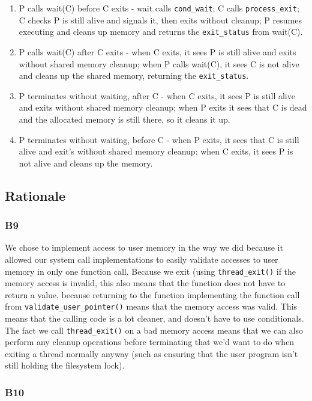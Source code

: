 \documentclass[a4wide, 11pt]{article}
\newcommand{\tx}{\texttt}
\begin{document}
\begin{enumerate}
\item P calls wait(C) before C exits - wait calls \texttt{cond\_wait}; C calls \texttt{process\_exit}; C checks P is still alive and signals it, then exits without cleanup; P resumes executing and cleans up memory and returns the \texttt{exit\_status} from wait(C).
\item P calls wait(C) after C exits - when C exits, it sees P is still alive and exits without shared memory cleanup; when P calls wait(C), it sees C is not alive and cleans up the shared memory, returning the \texttt{exit\_status}.
\item P terminates without waiting, after C - when C exits, it sees P is still alive and exits without shared memory cleanup; when P exits it sees that C is dead and the allocated memory is still there, so it cleans it up.
\item P terminates without waiting, before C - when P exits, it sees that C is still alive and exit's without shared memory cleanup; when C exits, it sees P is not alive and cleans up the memory.
\end{enumerate}


\subsection{Rationale}
\subsubsection{B9}

We chose to implement access to user memory in the way we did because it allowed our system call implementations to easily validate accesses to user memory in only one function call. Because we exit (using \tx{thread\_exit()} if the memory access is invalid, this also means that the function does not have to return a value, because returning to the function implementing the function call from \tx{validate\_user\_pointer()} means that the memory access was valid. This means that the calling code is a lot cleaner, and doesn't have to use conditionals. The fact we call \tx{thread\_exit()} on a bad memory access means that we can also perform any cleanup operations before terminating that we'd want to do when exiting a thread normally anyway (such as ensuring that the user program isn't still holding the filesystem lock).

\subsubsection{B10}
\end{document}
